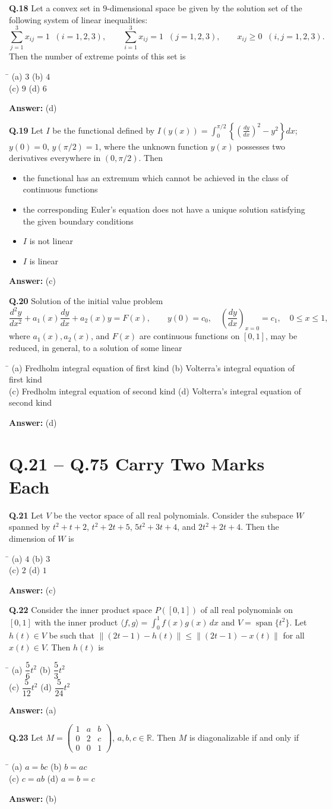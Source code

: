 \documentclass[11pt,a4paper]{article}
\newcommand{\optsfour}[4]{%
  \begin{tabbing}
    \hspace{0.48\linewidth}\=\kill
    (a) #1 \> (b) #2 \\[2pt]
    (c) #3 \> (d) #4
  \end{tabbing}%
}
\newcommand{\optslist}[4]{%
  \begin{itemize}
    \setlength{\itemsep}{2pt}\setlength{\parskip}{0pt}
    \item[(a)] #1
    \item[(b)] #2
    \item[(c)] #3
    \item[(d)] #4
  \end{itemize}%
}
\newcommand{\ans}[1]{\textbf{Answer:} #1\par\medskip}
\begin{document}
\textbf{Q.18} Let a convex set in $9$-dimensional space be given by the solution set of the following system of linear inequalities:
\[
  \sum_{j=1}^{3} x_{ij} = 1 \;\;(i = 1,2,3), \qquad \sum_{i=1}^{3} x_{ij} = 1 \;\;(j = 1,2,3), \qquad x_{ij} \ge 0 \;\;(i,j = 1,2,3).
\]
Then the number of extreme points of this set is
\optsfour{$3$}{$4$}{$9$}{$6$}
\ans{(d)}

\textbf{Q.19} Let $I$ be the functional defined by $I(y(x)) = \displaystyle\int_0^{\pi/2} \left\{\left(\frac{dy}{dx}\right)^2 - y^2\right\}dx$; $y(0) = 0$, $y(\pi/2) = 1$, where the unknown function $y(x)$ possesses two derivatives everywhere in $(0, \pi/2)$. Then
\optslist{the functional has an extremum which cannot be achieved in the class of continuous functions}{the corresponding Euler's equation does not have a unique solution satisfying the given boundary conditions}{$I$ is not linear}{$I$ is linear}
\ans{(c)}

\textbf{Q.20} Solution of the initial value problem
\[
  \frac{d^2 y}{dx^2} + a_1(x)\frac{dy}{dx} + a_2(x)y = F(x), \qquad y(0) = c_0, \quad \left(\frac{dy}{dx}\right)_{x=0} = c_1, \quad 0 \le x \le 1,
\]
where $a_1(x), a_2(x)$, and $F(x)$ are continuous functions on $[0, 1]$, may be reduced, in general, to a solution of some linear
\optsfour{Fredholm integral equation of first kind}{Volterra's integral equation of first kind}{Fredholm integral equation of second kind}{Volterra's integral equation of second kind}
\ans{(d)}

\section*{Q.21 -- Q.75 Carry Two Marks Each}

\textbf{Q.21} Let $V$ be the vector space of all real polynomials. Consider the subspace $W$ spanned by $t^2 + t + 2$, $t^2 + 2t + 5$, $5t^2 + 3t + 4$, and $2t^2 + 2t + 4$. Then the dimension of $W$ is
\optsfour{$4$}{$3$}{$2$}{$1$}
\ans{(c)}

\textbf{Q.22} Consider the inner product space $P([0,1])$ of all real polynomials on $[0, 1]$ with the inner product $\langle f, g \rangle = \displaystyle\int_0^1 f(x)g(x)\,dx$ and $V = \operatorname{span}\{t^2\}$. Let $h(t) \in V$ be such that $\|(2t - 1) - h(t)\| \le \|(2t - 1) - x(t)\|$ for all $x(t) \in V$. Then $h(t)$ is
\optsfour{$\dfrac{5}{6}t^2$}{$\dfrac{5}{3}t^2$}{$\dfrac{5}{12}t^2$}{$\dfrac{5}{24}t^2$}
\ans{(a)}

\textbf{Q.23} Let $M = \begin{pmatrix} 1 & a & b \\ 0 & 2 & c \\ 0 & 0 & 1 \end{pmatrix}$, $a, b, c \in \mathbb{R}$. Then $M$ is diagonalizable if and only if
\optsfour{$a = bc$}{$b = ac$}{$c = ab$}{$a = b = c$}
\ans{(b)}
\end{document}

